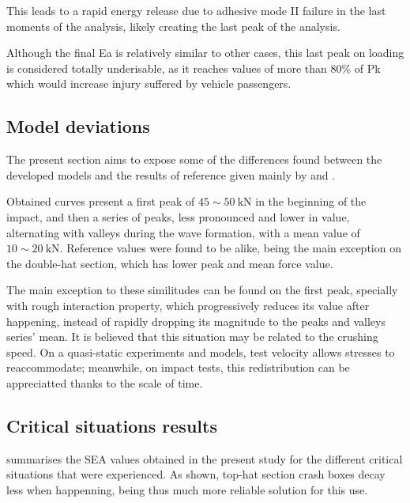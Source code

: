 \documentclass[
documentsize = a4, %
font = cmr, %
typesize = 11, %
printmode = true,
onehalfspacing = true,
language = en, %
titlepage = udciccp, %
degree = pt, %
dedication = true,
acknowledgements = true,
abstract-en = true,
abstract-es = false,
abstract-ga = false,
epigraphs = true,
toc = true,
lof = true,
lot = true,
frontmatterintoc = false,
notation = false,
minimal = false,
]{UDCthesis}
\begin{document}
This leads to a rapid energy release due to adhesive mode II failure in the last moments of the analysis, likely creating the last peak of the analysis.

Although the final \gls{Ea} is relatively similar to other cases, this last peak on loading is considered totally underisable, as it reaches values of more than $80\%$ of \gls{Pk} which would increase injury suffered by vehicle passengers.

\subsection{Model deviations}
The present section aims to expose some of the differences found between the developed models and the results of reference given mainly by \citet{Scattina2011} and \citet{Peroni2009}.

Obtained curves present a first peak of $\num{45}\sim\SI{50}{\kN}$ in the beginning of the impact, and then a series of peaks, less pronounced and lower in value, alternating with valleys during the wave formation, with a mean value of $\num{10}\sim\SI{20}{\kN}$. Reference values were found to be alike, being the main exception on the double-hat section, which has lower peak and mean force value.

The main exception to these similitudes can be found on the first peak, specially with rough interaction property, which progressively reduces its value after happening, instead of rapidly dropping its magnitude to the peaks and valleys series' mean. It is believed that this situation may be related to the crushing speed. On a quasi-static experiments and models, test velocity allows stresses to reaccommodate; meanwhile, on impact tests, this redistribution can be appreciatted thanks to the scale of time.

\subsection{Critical situations results}

 summarises the \gls{SEA} values obtained in the present study for the different critical situations that were experienced. As shown, top-hat section crash boxes decay less when happenning, being thus much more reliable solution for this use.
\end{document}

